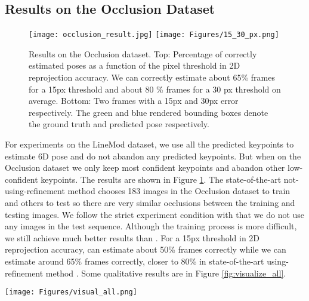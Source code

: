 \documentclass[10pt,twocolumn,letterpaper]{article}
\begin{document}
\subsection{Results on the Occlusion Dataset}
\label{sec:occlusionresult}
\begin{figure}[t]
\begin{center}
   \texttt{[image: occlusion\_result.jpg]}
    \texttt{[image: Figures/15\_30\_px.png]}
\end{center}
   \caption{Results on the Occlusion dataset. Top: Percentage of correctly estimated poses as a function of the pixel threshold in 2D reprojection accuracy. We can correctly estimate about 65\% frames for a 15px threshold and about 80 \% frames for a 30 px threshold on average. Bottom: Two frames with a 15px and 30px error respectively. The green and blue rendered bounding boxes denote the ground truth and predicted pose respectively.}
\label{fig:occlusion_result}
\end{figure}
For experiments on the LineMod dataset, we use all the predicted keypoints to estimate 6D pose and do not abandon any predicted keypoints. But when on the Occlusion dataset we only keep  most confident keypoints and abandon other low-confident keypoints. The results are shown in Figure \ref{fig:occlusion_result}. The state-of-the-art not-using-refinement method \cite{tekin18} chooses 183 images in the Occlusion dataset to train and others to test so there are very similar occlusions between the training and testing images. We follow the strict experiment condition with \cite{Rad2017BB8AS} that we do not use any images in the test sequence. Although the training process is more difficult, we still achieve much better results than  \cite{tekin18}. For a 15px threshold in 2D reprojection accuracy, \cite{tekin18} can estimate about 50\% frames correctly while we can estimate around 65\% frames correctly, closer to 80\% in state-of-the-art using-refinement method \cite{Rad2017BB8AS}. Some qualitative results are in Figure \ref{fig:visualize_all}.

\begin{figure*}[t]
\begin{center}
   \texttt{[image: Figures/visual\_all.png]}
\end{center}
   \caption{Qualitative results on LineMod and Occlusion datasets. First two rows: Results on the LineMod dataset, our method can estimate 6D pose correctly in challenging scenes with extreme lighting conditions, heavy clutter and motion blur. Third row: Result on the Occlusion dataset. We can still recover pose correctly when partial occlusion exists. Last row: Failure cases on the Occlusion dataset due to severe blur or overly deficient feature information.}
\label{fig:visualize_all}
\end{figure*}
\end{document}
